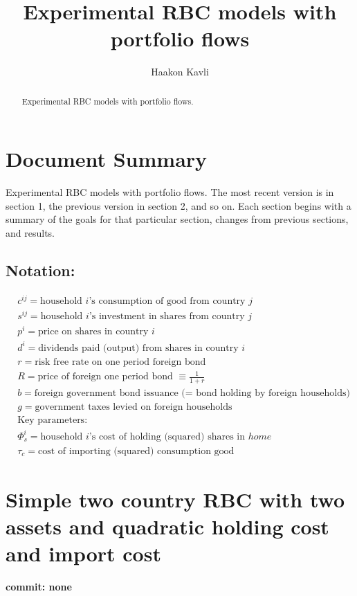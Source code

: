 \documentclass[a4paper]{article}
\begin{document}
\title{Experimental RBC models with portfolio flows}
\author{Haakon Kavli}
\maketitle
\begin{abstract}
Experimental RBC models with portfolio flows. 
\end{abstract}

\section{Document Summary}
Experimental RBC models with portfolio flows. The most recent version is in section 1, the previous version in section 2, and so on. Each section begins with a summary of the goals for that particular section, changes from previous sections, and results. 

\subsection{Notation:} 
\begin{align*}
&c^{ij} = \text{household } i \text{'s consumption of good from country } j \\
&s^{ij} = \text{household } i \text{'s investment in shares from country } j \\
&p^{i} = \text{price on shares in country } i \\
&d^{i} = \text{dividends paid (output) from shares in country } i\\
&r = \text{risk free rate on one period foreign bond}\\
&R = \text{price of foreign one period bond }\equiv \frac{1}{1+r}\\
&b = \text{foreign government bond issuance (= bond holding by foreign households)}\\
&g = \text{government taxes levied on foreign households}\\
&\text{Key parameters:}\\
&\Phi^{i}_s = \text{household } i \text{'s cost of holding (squared) shares in }home\\
&\tau_c = \text{cost of importing (squared) consumption good }
\end{align*}


\section{Simple two country RBC with two assets and quadratic holding cost and import cost}\label{SimplifySquareTax}
\textbf{commit: none}
\end{document}
